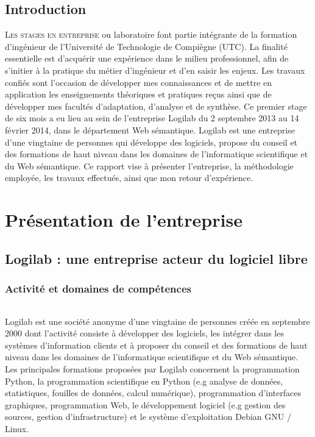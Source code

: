 \documentclass {report}
\begin{document}
\clearpage
\begin{flushright}
\begin{minipage}[c]{7cm}
\chapter*{Introduction}
    \lettrine{L}{es stages en entreprise} ou laboratoire font partie intégrante de la formation d’ingénieur de l’Université de Technologie de Compiègne (UTC). La finalité essentielle est d'acquérir une expérience dans le milieu professionnel, afin de s'initier à la pratique du métier d’ingénieur et d'en saisir les enjeux. Les travaux confiés sont l’occasion de développer mes connaissances et de mettre en application les enseignements théoriques et pratiques reçus ainsi que de développer mes facultés d’adaptation, d’analyse et de synthèse. Ce premier stage de six mois a eu lieu au sein de l’entreprise Logilab du 2 septembre 2013 au 14 février 2014, dans le département Web sémantique. Logilab est une entreprise d'une vingtaine de personnes qui développe des logiciels, propose du conseil et des formations de haut niveau dans les domaines de l’informatique scientifique et du Web sémantique. Ce rapport vise à présenter l'entreprise, la méthodologie employée, les travaux effectués, ainsi que mon retour d'expérience.
\end{minipage}
\end{flushright}
\pagestyle{headings}


\part{Présentation de l'entreprise}

\chapter{Logilab : une entreprise acteur du logiciel libre}
\section{Activité et domaines de compétences}
\paragraph{}
Logilab est une société anonyme d'une vingtaine de personnes créée en septembre 2000 dont l'activité consiste à développer des logiciels, les intégrer dans les systèmes d'information clients et à proposer du conseil et des formations de haut niveau dans les domaines de l'informatique scientifique et du Web sémantique\footnotemark[1]. Les principales formations proposées par Logilab concernent la programmation Python, la programmation scientifique en Python (e.g analyse de données, statistiques, fouilles de données, calcul numérique), programmation d'interfaces graphiques, programmation Web, le développement logiciel (e.g gestion des sources, gestion d'infrastructure) et le système d'exploitation Debian GNU / Linux.
\end{document}
